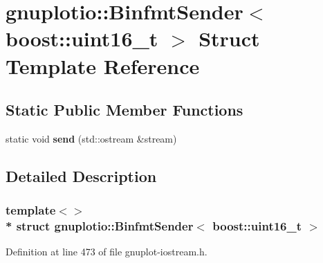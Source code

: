 \hypertarget{structgnuplotio_1_1_binfmt_sender_3_01boost_1_1uint16__t_01_4}{}\section{gnuplotio\+:\+:Binfmt\+Sender$<$ boost\+:\+:uint16\+\_\+t $>$ Struct Template Reference}
\label{structgnuplotio_1_1_binfmt_sender_3_01boost_1_1uint16__t_01_4}
\subsection*{Static Public Member Functions}
\begin{DoxyCompactItemize}
\item 
static void {\bfseries send} (std\+::ostream \&stream)\hypertarget{structgnuplotio_1_1_binfmt_sender_3_01boost_1_1uint16__t_01_4_a7bb7f0a62a21496b9e85ce35f0170717}{}\label{structgnuplotio_1_1_binfmt_sender_3_01boost_1_1uint16__t_01_4_a7bb7f0a62a21496b9e85ce35f0170717}

\end{DoxyCompactItemize}


\subsection{Detailed Description}
\subsubsection*{template$<$$>$\\*
struct gnuplotio\+::\+Binfmt\+Sender$<$ boost\+::uint16\+\_\+t $>$}



Definition at line 473 of file gnuplot-\/iostream.\+h.

